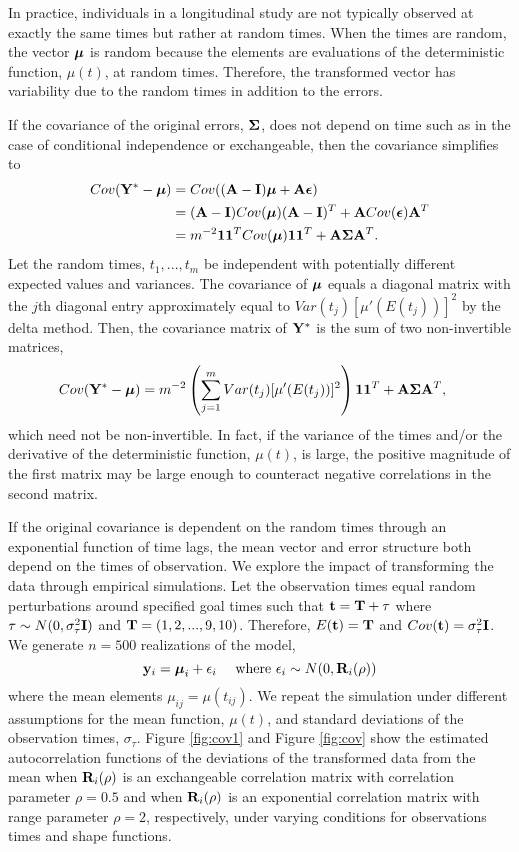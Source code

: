 In practice, individuals in a longitudinal study are not typically observed at exactly the same times but rather at random times. When the times are random, the vector $\boldsymbol\mu$ is random because the elements are evaluations of the deterministic function, $\mu(t)$, at random times. Therefore, the transformed vector has variability due to the random times in addition to the errors. 

If the covariance of the original errors, $\boldsymbol \Sigma$, does not depend on time such as in the case of conditional independence or exchangeable, then the covariance simplifies to
\begin{align*}
Cov(\mathbf Y^{*} - \boldsymbol\mu) &= Cov((\mathbf A-\mathbf I)\boldsymbol\mu + \mathbf A \boldsymbol\epsilon)\\
&=(\mathbf A-\mathbf I) Cov(\boldsymbol\mu)(\mathbf A-\mathbf I)^{T} + \mathbf A Cov(\boldsymbol\epsilon)\mathbf A^{T}\\
&=m^{-2}\mathbf 1\mathbf 1^{T} Cov(\boldsymbol\mu)\mathbf 1\mathbf 1^{T} + \mathbf A\boldsymbol\Sigma\mathbf A^{T}.
\end{align*}
Let the random times, $t_{1},...,t_{m}$ be independent with potentially different expected values and variances. The covariance of $\boldsymbol\mu$ equals a diagonal matrix with the $j$th diagonal entry approximately equal to $Var(t_{j})[\mu'(E(t_{j}))]^{2}$ by the delta method. Then, the covariance matrix of $\mathbf Y^{*}$ is the sum of two non-invertible matrices,
\begin{align*}
Cov(\mathbf Y^{*} - \boldsymbol\mu) &=m^{-2}\left(\sum^{m}_{j=1}Var(t_{j})[\mu'(E(t_{j}))]^{2}\right) \mathbf 1\mathbf 1^{T}  + \mathbf A\boldsymbol\Sigma\mathbf A^{T},
\end{align*}
which need not be non-invertible. In fact, if the variance of the times and/or the derivative of the deterministic function, $\mu(t)$, is large, the positive magnitude of the first matrix may be large enough to counteract negative correlations in the second matrix. 

If the original covariance is dependent on the random times through an exponential function of time lags, the mean vector and error structure both depend on the times of observation. We explore the impact of transforming the data through empirical simulations. Let the observation times equal random perturbations around specified goal times such that $\mathbf t = \mathbf T + \mathbf \tau$ where $\mathbf \tau\sim N(0,\sigma^{2}_{\tau}\mathbf I)$ and $\mathbf T = (1,2,...,9,10)$. Therefore, $E(\mathbf t) = \mathbf T$ and $Cov(\mathbf t ) = \sigma^{2}_{\tau}\mathbf I$. We generate $n=500$ realizations of the model,
$$\mathbf y_{i} = \boldsymbol\mu_{i} + \epsilon_{i}\quad\text{ where }\epsilon_{i}\sim N(0,\mathbf R_{i}(\rho))$$
where the mean elements $\mu_{ij}=\mu(t_{ij})$. We repeat the simulation under different assumptions for the mean function, $\mu(t)$, and standard deviations of the observation times, $\sigma_{\tau}$. Figure \ref{fig:cov1} and Figure \ref{fig:cov} show the estimated autocorrelation functions of the deviations of the transformed data from the mean when $\mathbf R_{i}(\rho)$ is an exchangeable correlation matrix with correlation parameter $\rho=0.5$ and when  $\mathbf R_{i}(\rho)$ is an exponential correlation matrix with range parameter $\rho=2$, respectively, under varying conditions for observations times and shape functions.


